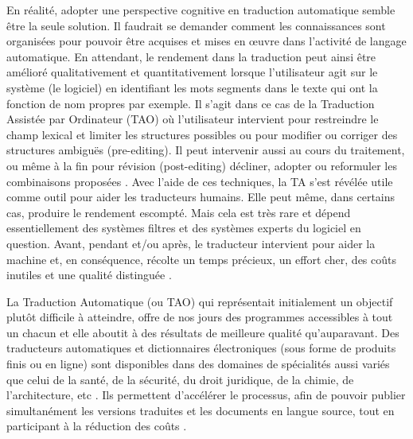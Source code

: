 \documentclass[french]{textolivre}
\begin{document}
En réalité, adopter une perspective cognitive \cite[p. 10]{fuchs2017} en traduction automatique semble être la seule solution. Il faudrait se demander comment les connaissances sont organisées pour pouvoir être acquises et mises en œuvre dans l’activité de langage automatique. En attendant, le rendement dans la traduction peut ainsi être amélioré qualitativement et quantitativement lorsque l’utilisateur agit sur le système (le logiciel) en identifiant les mots segments dans le texte qui ont la fonction de nom propres par exemple. Il s’agit dans ce cas de la Traduction Assistée par Ordinateur (TAO) où l’utilisateur intervient pour restreindre le champ lexical et limiter les structures possibles ou pour modifier ou corriger des structures ambiguës (pre-editing). Il peut intervenir aussi au cours du traitement, ou même à la fin pour révision (post-editing) décliner, adopter ou reformuler les combinaisons proposées \cite{lab_traduction_nodate, alcina2008, paulsen2016}. Avec l'aide de ces techniques, la TA s’est révélée utile comme outil pour aider les traducteurs humains. Elle peut même, dans certains cas, produire le rendement escompté. Mais cela est très rare et dépend essentiellement des systèmes filtres et des systèmes experts du logiciel en question. Avant, pendant et/ou après, le traducteur intervient pour aider la machine et, en conséquence, récolte un temps précieux, un effort cher, des coûts inutiles et une qualité distinguée \cite[p. 279]{zemni2020}.

La Traduction Automatique (ou TAO) qui représentait initialement un objectif plutôt difficile à atteindre, offre de nos jours des programmes accessibles à tout un chacun et elle aboutit à des résultats de meilleure qualité qu’auparavant. Des traducteurs automatiques et dictionnaires électroniques (sous forme de produits finis ou en ligne) sont disponibles dans des domaines de spécialités aussi variés que celui de la santé, de la sécurité, du droit juridique, de la chimie, de l’architecture, etc \cite{hutchins1992}. Ils permettent d’accélérer le processus, afin de pouvoir publier simultanément les versions traduites et les documents en langue source, tout en participant à la réduction des coûts \cite{ke_hu2020}.
\end{document}
